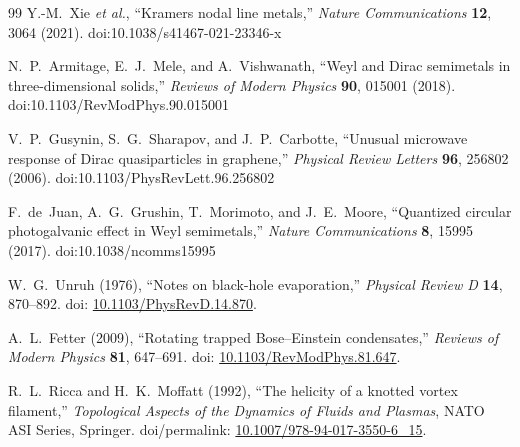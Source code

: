 \documentclass[11pt]{article}
\begin{document}
\begin{thebibliography}{99}
        Y.-M.~Xie \emph{et al.},
        ``Kramers nodal line metals,''
        \emph{Nature Communications} \textbf{12}, 3064 (2021).
        doi:10.1038/s41467-021-23346-x

        N.~P.~Armitage, E.~J.~Mele, and A.~Vishwanath,
        ``Weyl and Dirac semimetals in three-dimensional solids,''
        \emph{Reviews of Modern Physics} \textbf{90}, 015001 (2018).
        doi:10.1103/RevModPhys.90.015001

        V.~P.~Gusynin, S.~G.~Sharapov, and J.~P.~Carbotte,
        ``Unusual microwave response of Dirac quasiparticles in graphene,''
        \emph{Physical Review Letters} \textbf{96}, 256802 (2006).
        doi:10.1103/PhysRevLett.96.256802

        F.~de~Juan, A.~G.~Grushin, T.~Morimoto, and J.~E.~Moore,
        ``Quantized circular photogalvanic effect in Weyl semimetals,''
        \emph{Nature Communications} \textbf{8}, 15995 (2017).
        doi:10.1038/ncomms15995


    W.~G.~Unruh (1976),
    ``Notes on black-hole evaporation,''
    \emph{Physical Review D} \textbf{14}, 870--892.
    doi: \href{https://doi.org/10.1103/PhysRevD.14.870}{10.1103/PhysRevD.14.870}.

    A.~L.~Fetter (2009),
    ``Rotating trapped Bose--Einstein condensates,''
    \emph{Reviews of Modern Physics} \textbf{81}, 647--691.
    doi: \href{https://doi.org/10.1103/RevModPhys.81.647}{10.1103/RevModPhys.81.647}.

    R.~L.~Ricca and H.~K.~Moffatt (1992),
    ``The helicity of a knotted vortex filament,''
    \emph{Topological Aspects of the Dynamics of Fluids and Plasmas},
    NATO ASI Series, Springer.
    doi/permalink: \href{https://doi.org/10.1007/978-94-017-3550-6_15}{10.1007/978-94-017-3550-6_15}.

    \end{thebibliography}
\end{document}
